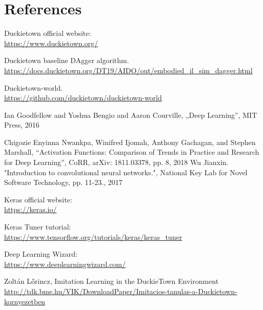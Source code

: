 \documentclass{article}
\begin{document}

\section*{References}
\vspace*{1\baselineskip}

Duckietown official website:
\\
\url{https://www.duckietown.org/}
\vspace*{1\baselineskip}

Duckietown baseline DAgger algorithm.
\\
\url{https://docs.duckietown.org/DT19/AIDO/out/embodied_il_sim_dagger.html} 
\vspace*{1\baselineskip}

Duckietown-world.
\\
\url{https://github.com/duckietown/duckietown-world}

\vspace*{1\baselineskip}

Ian Goodfellow and Yoshua Bengio and Aaron Courville, „Deep Learning”, MIT Press, 2016

\vspace*{1\baselineskip}
Chigozie Enyinna Nwankpa, Winifred Ijomah, Anthony Gachagan, and Stephen Marshall, “Activation Functions: Comparison of Trends in Practice and Research for Deep Learning”, CoRR, arXiv: 1811.03378, pp. 8, 2018
\vspace*{1\baselineskip}
Wu Jianxin. "Introduction to convolutional neural networks.", National Key Lab for Novel Software Technology, pp. 11-23., 2017
\vspace*{1\baselineskip}
\vspace*{1\baselineskip}

Keras official website: 
\\
\url{https://keras.io/}
\vspace*{1\baselineskip}

Keras Tuner tutorial: 
\\
\url{https://www.tensorflow.org/tutorials/keras/keras_tuner}
\vspace*{1\baselineskip}

Deep Learning Wizard: 
\\
\url{https://www.deeplearningwizard.com/}
\vspace*{1\baselineskip}

Zoltán Lőrincz, Imitation Learning in the DuckieTown Environment
\\
\url{http://tdk.bme.hu/VIK/DownloadPaper/Imitacios-tanulas-a-Duckietown-kornyezetben}

\pagebreak

\clearpage
\end{document}
